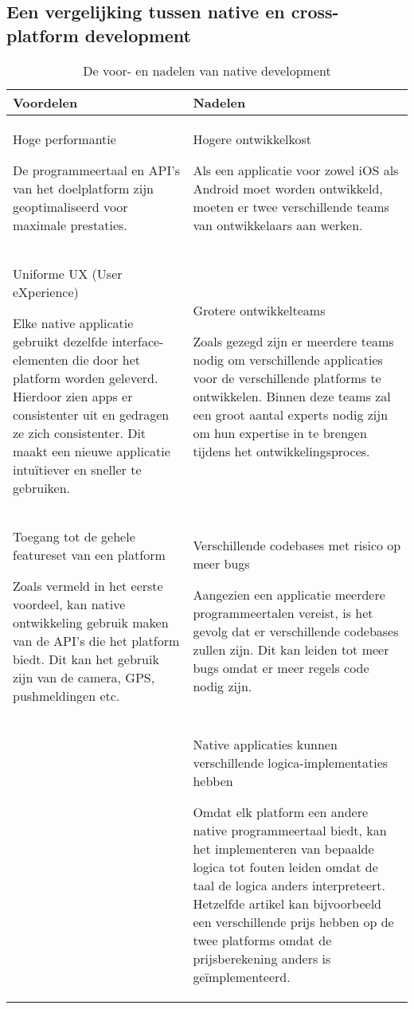 \subsection{Een vergelijking tussen native en cross-platform development}
\begin{table}[H]
    \centering
    \begin{tabular}{|p{3.0in}|p{3.0in}|}
        \hline
            Voordelen & Nadelen 
            \\
        \hline
        \hline
        Hoge performantie
        
        De programmeertaal en API's van het doelplatform zijn geoptimaliseerd voor maximale prestaties.
            &
        Hogere ontwikkelkost
        
        Als een applicatie voor zowel iOS als Android moet worden ontwikkeld, moeten er twee verschillende teams van ontwikkelaars aan werken.
        \\\hline
        Uniforme UX (User eXperience)
        
        Elke native applicatie gebruikt dezelfde interface-elementen die door het platform worden geleverd. Hierdoor zien apps er consistenter uit en gedragen ze zich consistenter. Dit maakt een nieuwe applicatie intuïtiever en sneller te gebruiken.
            &
        Grotere ontwikkelteams
        
        Zoals gezegd zijn er meerdere teams nodig om verschillende applicaties voor de verschillende platforms te ontwikkelen. Binnen deze teams zal een groot aantal experts nodig zijn om hun expertise in te brengen tijdens het ontwikkelingsproces.
        \\\hline
        Toegang tot de gehele featureset van een platform
        
        Zoals vermeld in het eerste voordeel, kan native ontwikkeling gebruik maken van de API's die het platform biedt. Dit kan het gebruik zijn van de camera, GPS, pushmeldingen etc.
            &
        Verschillende codebases met risico op meer bugs
        
        Aangezien een applicatie meerdere programmeertalen vereist, is het gevolg dat er verschillende codebases zullen zijn.
        Dit kan leiden tot meer bugs omdat er meer regels code nodig zijn.
        \\\hline
        
            &
        Native applicaties kunnen verschillende logica-implementaties hebben
        
        Omdat elk platform een andere native programmeertaal biedt, kan het implementeren van bepaalde logica tot fouten leiden omdat de taal de logica anders interpreteert.
        Hetzelfde artikel kan bijvoorbeeld een verschillende prijs hebben op de twee platforms omdat de prijsberekening anders is geïmplementeerd.
        \\\hline
    \end{tabular}
    \caption{De voor- en nadelen van native development}
    \label{tab:nativeDevelopmentTable}
\end{table}

